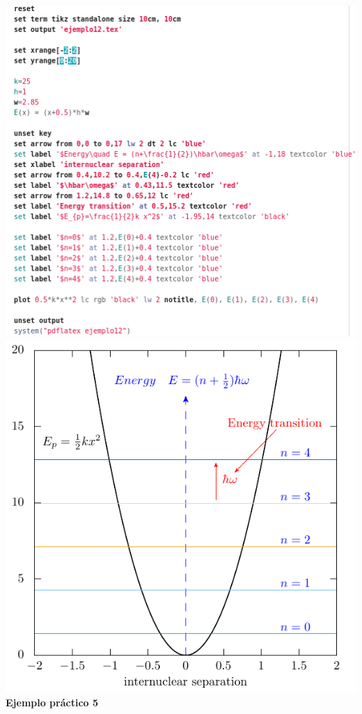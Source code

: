 \documentclass[11.5pt,a4paper]{article}
\begin{document}
\includegraphics[scale=0.50]{screen6.png}
\includegraphics[scale=0.80]{ejemplo12.pdf}\\   

\textbf{Ejemplo práctico 5}\\
\end{document}
